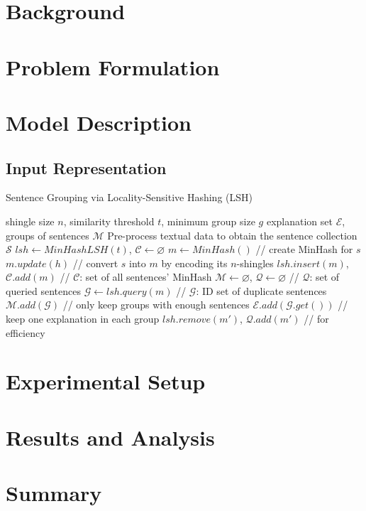 \section{Background}

\lipsum[1-3]

\section{Problem Formulation} \label{sec3:problem}

\lipsum[1-3]

\section{Model Description}

\lipsum[1-3]

\subsection{Input Representation}

\begin{algorithm}
	\caption{Sentence Grouping via Locality-Sensitive Hashing (LSH)}
	\label{alg3:lsh}
	\begin{algorithmic}[1]
		\REQUIRE shingle size $n$, similarity threshold $t$, minimum group size $g$
		\ENSURE explanation set $\mathcal{E}$, groups of sentences $\mathcal{M}$
		\STATE Pre-process textual data to obtain the sentence collection $\mathcal{S}$
		\STATE $lsh \gets MinHashLSH(t)$, $\mathcal{C} \gets \varnothing$
		\STATE $m \gets MinHash()$  // create MinHash for $s$
		\STATE $m.update(h)$  // convert $s$ into $m$ by encoding its $n$-shingles
		\ENDFOR
		\STATE $lsh.insert(m)$, $\mathcal{C}.add(m)$  // $\mathcal{C}$: set of all sentences' MinHash
		\ENDFOR
		\STATE $\mathcal{M} \gets \varnothing$, $\mathcal{Q} \gets \varnothing$  // $\mathcal{Q}$: set of queried sentences
		\STATE $\mathcal{G} \gets lsh.query(m)$  // $\mathcal{G}$: ID set of duplicate sentences
		\STATE $\mathcal{M}.add(\mathcal{G})$  // only keep groups with enough sentences
		\STATE $\mathcal{E}.add(\mathcal{G}.get())$  // keep one explanation in each group
		\ENDIF
		\STATE $lsh.remove(m')$, $\mathcal{Q}.add(m')$  // for efficiency
		\ENDFOR
		\ENDIF
		\ENDFOR
	\end{algorithmic}
\end{algorithm}


\section{Experimental Setup}





\section{Results and Analysis}



\section{Summary}
